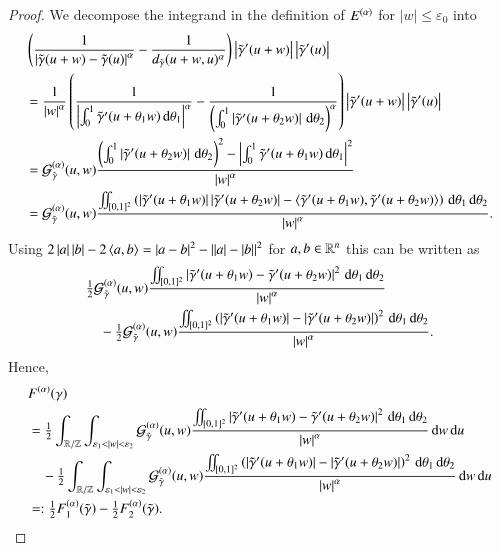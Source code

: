 \begin{proof}
 We decompose the integrand in the definition of $\E$ for $|w| \leq \varepsilon_0$ into
 \begin{align*}
  &\br{\frac1{\abs{\D\gt}^\alpha}-\frac1{d_{\gt}(u+w,u)^\alpha}}\abs{\dgt(u+w)}\abs{\dgt(u)}\\
  &=\frac1{\abs w^\a}\br{\frac1{\abs{\int_0^1\dgt(u+\theta_1w)\d\theta_1}^\alpha}-\frac1{\br{\int_0^1\abs{\dgt(u+\theta_2w)}\d\theta_2}^\alpha}}\abs{\dgt(u+w)}\abs{\dgt(u)}\\
  &=\G[\gt](u,w)\frac{\br{\int_0^1 \abs{\dgt(u+\theta_2w)}\d\theta_2}^2 - \abs{\int_0^1\dgt(u+\theta_1w)\d\theta_1}^2}{\abs w^{\alpha}}  \\
  &=\G[\gt](u,w)\frac{\iint_{[0,1]^2} \br{\abs{\dgt(u+\theta_1w)}\abs{\dgt(u+\theta_2w)} - \sp{\dgt(u+\theta_1w),\dgt(u+\theta_2w)}} \d\theta_1\d\theta_2}{\abs w^{\alpha}}.
 \end{align*}
 Using $2\abs a\abs b-2\sp{a,b} = \abs{a-b}^2 - \abs{\abs a-\abs b}^2$ for $a,b\in\R^n$ 
 this can be written as
 \begin{align*}
  &\tfrac12 \G[\gt](u,w)\frac{\iint_{[0,1]^2}\abs{\dgt(u+\theta_1w)-\dgt(u+\theta_2w)}^2\d\theta_1\d\theta_2}{\abs w^\alpha} \\
  &\quad{}-\tfrac12 \G[\gt](u,w)\frac{\iint_{[0,1]^2}\br{\abs{\dgt(u+\theta_1w)}-\abs{\dgt(u+\theta_2w)}}^2\d\theta_1\d\theta_2}{\abs w^\alpha}.
 \end{align*}
 Hence, 
 \begin{align*}
  &F^{(\alpha)}(\gamma) \\ &=  \tfrac12 \int_{\mathbb R / \mathbb Z}
  \int_{\varepsilon_1 < |w| < \varepsilon_2}\G[\gt](u,w)\frac{\iint_{[0,1]^2}\abs{\dgt(u+\theta_1w)-\dgt(u+\theta_2w)}^2\d\theta_1\d\theta_2}{\abs w^\alpha}\d w\d u \\
  &\quad{}-\tfrac12  \int_{\mathbb R / \mathbb Z}
  \int_{\varepsilon_1 < |w| < \varepsilon_2}\G[\gt](u,w)\frac{\iint_{[0,1]^2}\br{\abs{\dgt(u+\theta_1w)}-\abs{\dgt(u+\theta_2w)}}^2\d\theta_1\d\theta_2}{\abs w^\alpha}\d w\d u \\
  &=: \tfrac12 F_1^{(\alpha)}(\gt) - \tfrac12 F_2^{(\alpha)}(\gt).
 \end{align*}



\end{proof}
